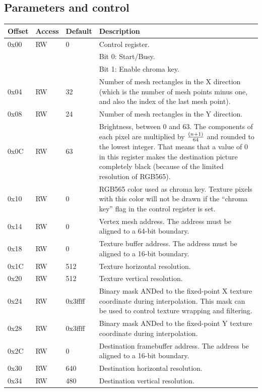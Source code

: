 \documentclass[a4paper,11pt]{article}
\begin{document}
\subsection{Parameters and control}
\begin{tabularx}{\textwidth}{|l|l|l|X|}
\hline
\bf{Offset} & \bf{Access} & \bf{Default} & \bf{Description} \\
\hline
0x00 & RW & 0 & Control register. \\
& & & Bit 0: Start/Busy.\\
& & & Bit 1: Enable chroma key. \\
\hline
0x04 & RW & 32 & Number of mesh rectangles in the X direction (which is the number of mesh points minus one, and also the index of the last mesh point). \\
\hline
0x08 & RW & 24 & Number of mesh rectangles in the Y direction. \\
\hline
0x0C & RW & 63 & Brightness, between 0 and 63. The components of each pixel are multiplied by $ (n+1) \over 64 $ and rounded to the lowest integer. That means that a value of 0 in this register makes the destination picture completely black (because of the limited resolution of RGB565). \\
\hline
0x10 & RW & 0 & RGB565 color used as chroma key. Texture pixels with this color will not be drawn if the ``chroma key'' flag in the control register is set. \\
\hline
0x14 & RW & 0 & Vertex mesh address. The address must be aligned to a 64-bit boundary. \\
\hline
0x18 & RW & 0 & Texture buffer address. The address must be aligned to a 16-bit boundary. \\
\hline
0x1C & RW & 512 & Texture horizontal resolution. \\
\hline
0x20 & RW & 512 & Texture vertical resolution. \\
\hline
0x24 & RW & 0x3ffff & Binary mask ANDed to the fixed-point X texture coordinate during interpolation. This mask can be used to control texture wrapping and filtering. \\
\hline
0x28 & RW & 0x3ffff & Binary mask ANDed to the fixed-point Y texture coordinate during interpolation. \\
\hline
0x2C & RW & 0 & Destination framebuffer address. The address be aligned to a 16-bit boundary. \\
\hline
0x30 & RW & 640 & Destination horizontal resolution. \\
\hline
0x34 & RW & 480 & Destination vertical resolution. \\

\end{tabularx}
\end{document}
